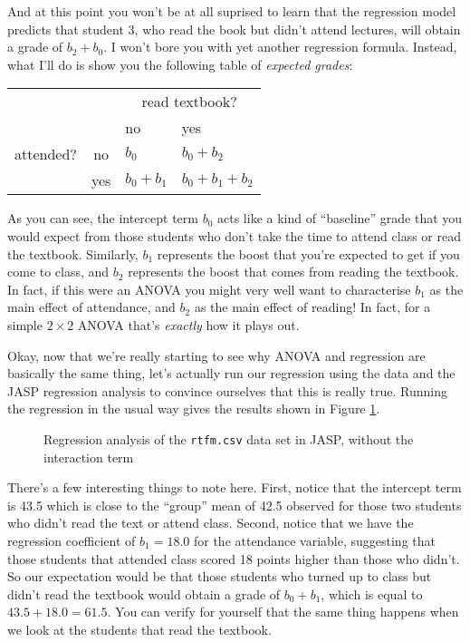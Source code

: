 And at this point you won't be at all suprised to learn that the regression model predicts that student 3, who read the book but didn't attend lectures, will obtain a grade of $b_2 + b_0$. I won't bore you with yet another regression formula. Instead, what I'll do is show you the following table of {\it expected grades}:
\begin{center}
\begin{tabular}{cc|ll} 
& & \multicolumn{2}{c}{read textbook?} \\
& & no & yes \\ \hline
attended? & no & $b_0$ & $b_0 + b_2$ \\
& yes & $b_0 + b_1$ & $b_0 + b_1 + b_2$ 
\end{tabular}
\end{center} 
As you can see, the intercept term $b_0$ acts like a kind of ``baseline'' grade that you would expect from those students who don't take the time to attend class or read the textbook. Similarly, $b_1$ represents the boost that you're expected to get if you come to class, and $b_2$ represents the boost that comes from reading the textbook. In fact, if this were an ANOVA you might very well want to characterise $b_1$ as the main effect of attendance, and $b_2$ as the main effect of reading! In fact, for a simple $2 \times 2$ ANOVA that's {\it exactly} how it plays out. 

Okay, now that we're really starting to see why ANOVA and regression are basically the same thing, let's actually run our regression using the  data and the JASP regression analysis to convince ourselves that this is really true. Running the regression in the usual way gives the results shown in Figure \ref{fig:factorialanova7}.

\begin{figure}[!htb]
\begin{center}
\caption{Regression analysis of the \texttt{rtfm.csv} data set in JASP, without the interaction term}
\label{fig:factorialanova7}
\HR
\end{center}
\end{figure}

There's a few interesting things to note here. First, notice that the intercept term is 43.5 which is close to the ``group'' mean of 42.5 observed for those two students who didn't read the text or attend class. Second, notice that we have the regression coefficient of $b_1 = 18.0$ for the attendance variable, suggesting that those students that attended class scored 18 points higher than those who didn't. So our expectation would be that those students who turned up to class but didn't read the textbook would obtain a grade of $b_0 + b_1$, which is equal to $43.5 + 18.0 = 61.5$. You can verify for yourself that the same thing happens when we look at the students that read the textbook.

